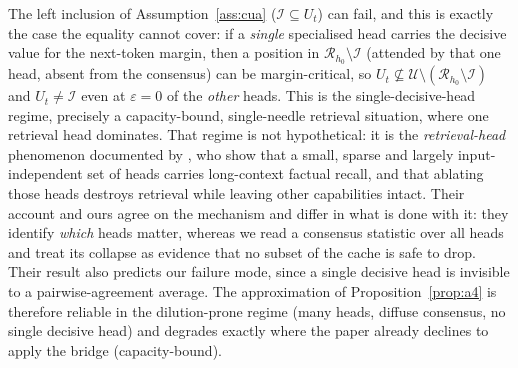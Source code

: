 \begin{remark}
\label{rem:a4-fail}
The left inclusion of Assumption~\ref{ass:cua} ($\mathcal{I}\subseteq U_t$) can
fail, and this is exactly the case the equality cannot cover: if a
\emph{single} specialised head carries the decisive value for the next-token
margin, then a position in $\mathcal{R}_{h_0}\setminus\mathcal{I}$ (attended by
that one head, absent from the consensus) can be margin-critical, so
$U_t\not\subseteq\mathcal{U}\setminus(\mathcal{R}_{h_0}\setminus\mathcal{I})$ and
$U_t\ne\mathcal{I}$ even at $\varepsilon=0$ of the \emph{other} heads. This is
the single-decisive-head regime, precisely a capacity-bound, single-needle
retrieval situation, where one retrieval head dominates. That regime is not
hypothetical: it is the \emph{retrieval-head} phenomenon documented by
\citet{wu2025retrieval}, who show that a small, sparse and largely
input-independent set of heads carries long-context factual recall, and that
ablating those heads destroys retrieval while leaving other capabilities
intact. Their account and ours agree on the mechanism and differ in what is
done with it: they identify \emph{which} heads matter, whereas we read a
consensus statistic over all heads and treat its collapse as evidence that no
subset of the cache is safe to drop. Their result also predicts our failure
mode, since a single decisive head is invisible to a pairwise-agreement
average. The approximation of
Proposition~\ref{prop:a4} is therefore reliable in the dilution-prone regime
(many heads, diffuse consensus, no single decisive head) and degrades exactly
where the paper already declines to apply the bridge (capacity-bound).
\end{remark}

